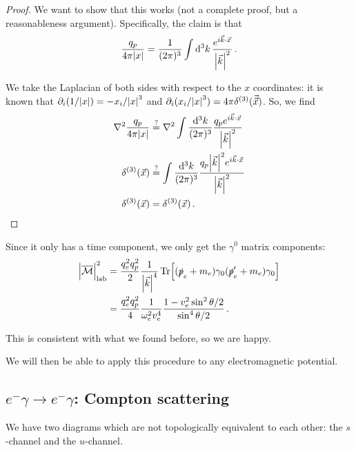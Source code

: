 \documentclass[main.tex]{subfiles}
\begin{document}
\begin{proof}
We want to show that this works (not a complete proof, but a reasonableness argument). Specifically, the claim is that 
%
\begin{align}
\frac{q_p}{4 \pi \abs{x}} = \frac{1}{(2 \pi )^3} \int \dd[3]{k} \frac{e^{i \vec{k} \cdot \vec{x}}}{\abs{\vec{k}}^2}
\,.
\end{align}

We take the Laplacian of both sides with respect to the \(x\) coordinates: it is known that \(\partial_{i} (1/ \abs{x}) = - x_i / \abs{x}^3\) and \(\partial_{i} (x_i / \abs{x}^3) = 4 \pi \delta^{(3)} (\vec{\vec{x}})\). So, we find 
%
\begin{align}
\nabla^2 \frac{q_p}{4 \pi \abs{x}} &\overset{?}{=}
\nabla^2 \int \frac{ \dd[3]{k}}{(2 \pi )^3}
\frac{q_p e^{i \vec{k} \cdot \vec{x}}}{\abs{\vec{k}}^2}  \\
\delta^{(3)}(\vec{x}) &\overset{?}{=}
\int \frac{ \dd[3]{k}}{(2 \pi )^3}
\frac{q_p \abs{\vec{k}}^2 e^{i \vec{k} \cdot \vec{x}}}{\abs{\vec{k}}^2}  \\
\delta^{(3)} (\vec{x}) &= \delta^{(3)}(\vec{x}) 
\,.
\end{align}
\end{proof}

Since it only has a time component, we only get the \(\gamma^{0}\) matrix components: 
%
\begin{align}
\abs{\mathcal{\overline{M}}}^2 _{\text{lab}} 
&= \frac{q_e^2 q_p^2}{2} 
\frac{1}{\abs{\vec{k}}^4} 
\Tr[(\slashed{p}_e + m_e) \gamma_{0} (\slashed{p}_e' + m_e) \gamma_{0}]  \\
&= \frac{q_e^2 q_p^2}{4} \frac{1}{\omega_{e}^2 v_e^4} \frac{1 - v_e^2 \sin^2 \theta/2}{\sin^{4} \theta /2} 
\,.
\end{align}

This is consistent with what we found before, so we are happy. 

We will then be able to apply this procedure to any electromagnetic potential. 

\subsection{\(e^{-} \gamma \to e^{-} \gamma \): Compton scattering}

We have two diagrams which are not topologically equivalent to each other: the \(s\)-channel and the \(u\)-channel. 

\end{document}
